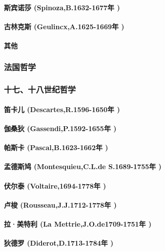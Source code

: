 \documentclass[UTF8]{../RepresentationUniverse}
\begin{document}
    \paragraph{斯宾诺莎 (Spinoza,B.1632-1677年 )}
    \paragraph{古林克斯 (Geulincx,A.1625-1669年 )}
    \paragraph{其他}



\subsubsection{法国哲学}
\subsubsection{十七、十八世纪哲学}
    \paragraph{笛卡儿 (Descartes,R.1596-1650年 )}
    \paragraph{伽桑狄 (Gassendi,P.1592-1655年 )}
    \paragraph{帕斯卡 (Pascal,B.1623-1662年 )}
    \paragraph{孟德斯鸠 (Montesquieu,C.L.de S.1689-1755年 )}
    \paragraph{伏尔泰 (Voltaire,1694-1778年 )}
    \paragraph{卢梭 (Rousseau,J.J.1712-1778年 )}
    \paragraph{拉·美特利 (La Mettrie,J.O.de1709-1751年 )}
    \paragraph{狄德罗 (Diderot,D.1713-1784年 )}
\end{document}
